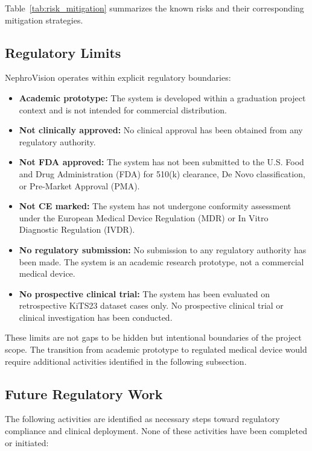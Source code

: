 

Table~\ref{tab:risk_mitigation} summarizes the known risks and their corresponding mitigation strategies.

\subsection{Regulatory Limits}

NephroVision operates within explicit regulatory boundaries:

\begin{itemize}
    \item \textbf{Academic prototype:} The system is developed within a graduation project context and is not intended for commercial distribution.
    \item \textbf{Not clinically approved:} No clinical approval has been obtained from any regulatory authority.
    \item \textbf{Not FDA approved:} The system has not been submitted to the U.S. Food and Drug Administration (FDA) for 510(k) clearance, De Novo classification, or Pre-Market Approval (PMA).
    \item \textbf{Not CE marked:} The system has not undergone conformity assessment under the European Medical Device Regulation (MDR) or In Vitro Diagnostic Regulation (IVDR).
    \item \textbf{No regulatory submission:} No submission to any regulatory authority has been made. The system is an academic research prototype, not a commercial medical device.
    \item \textbf{No prospective clinical trial:} The system has been evaluated on retrospective KiTS23 dataset cases only. No prospective clinical trial or clinical investigation has been conducted.
\end{itemize}

These limits are not gaps to be hidden but intentional boundaries of the project scope. The transition from academic prototype to regulated medical device would require additional activities identified in the following subsection.

\subsection{Future Regulatory Work}

The following activities are identified as necessary steps toward regulatory compliance and clinical deployment. None of these activities have been completed or initiated:

